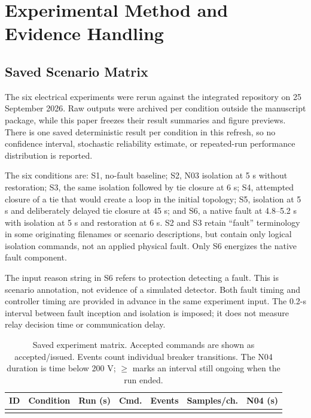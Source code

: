\section{Experimental Method and Evidence Handling}
\label{sec:methods}
\subsection{Saved Scenario Matrix}
The six electrical experiments were rerun against the integrated repository
on 25 September 2026. Raw outputs were archived per condition outside the
manuscript package, while this paper freezes their result summaries and
figure previews. There is one saved deterministic result per condition in
this refresh, so no confidence interval,
stochastic reliability estimate, or repeated-run performance distribution is
reported.

The six conditions are: S1, no-fault baseline; S2, N03 isolation at 5 s without
restoration; S3, the same isolation followed by tie closure at 6 s; S4, attempted
closure of a tie that would create a loop in the initial topology; S5, isolation
at 5 s and deliberately delayed tie closure at 45 s; and S6, a native fault
at 4.8--5.2 s with isolation at 5 s and restoration at 6 s. S2 and S3 retain
``fault'' terminology in some originating filenames or scenario descriptions,
but contain only logical isolation commands, not an applied physical fault.
Only S6 energizes the native fault component.

The input reason string in S6 refers to protection detecting a fault. This is
scenario annotation, not evidence of a simulated detector. Both fault timing
and controller timing are provided in advance in the same experiment input.
The 0.2-s interval between fault inception and isolation is imposed; it does
not measure relay decision time or communication delay.

\begin{table}[tb]
\centering\footnotesize
\caption{Saved experiment matrix. Accepted commands are shown as accepted/issued.
Events count individual breaker transitions. The N04 duration is time below
200 V; $\geq$ marks an interval still ongoing when the run ended.}
\label{tab:scenarios}
\begin{tabularx}{\textwidth}{@{}lXrrrrr@{}}
\toprule
ID & Condition & Run (s) & Cmd. & Events & Samples/ch. & N04 (s) \\
\midrule
\\
\bottomrule
\end{tabularx}
\end{table}

